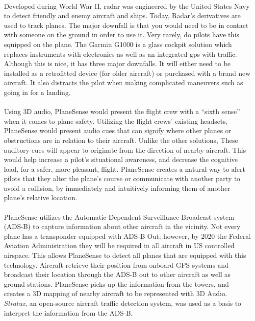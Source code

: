 \paragraph{}
Developed during World War II, radar was engineered by the United States Navy to detect friendly and enemy aircraft and ships. Today, Radar’s derivatives are used to track planes. The major downfall is that you would need to be in contact with someone on the ground in order to use it. Very rarely, do pilots have this equipped on the plane. The Garmin G1000 is a  glass cockpit solution which replaces instruments with electronics as well as an integrated gps with traffic. Although this is nice, it has three major downfalls. It will either need to be installed as a retrofitted device (for older aircraft) or purchased with a brand new aircraft. It also distracts the pilot when making complicated maneuvers such as going in for a landing.  

\paragraph{}

Using 3D audio, PlaneSense would present the flight crew with a “sixth sense” when it comes to plane safety.  Utilizing the flight crews’ existing headsets, PlaneSense would present audio cues that can signify where other planes or obstructions are in relation to their aircraft. Unlike the other solutions, These auditory cues will appear to originate from the direction of nearby aircraft.  This would help increase a pilot’s situational awareness, and decrease the cognitive load, for a safer, more pleasant, flight.  PlaneSense creates a natural way to alert pilots that they alter the plane’s course or communicate with another party to avoid a collision, by immediately and intuitively informing them of another plane's relative location. 


\paragraph{}
PlaneSense utilizes the  Automatic Dependent Surveillance-Broadcast system (ADS-B) to capture information about other aircraft in the vicinity.  Not every plane has a transponder equipped with ADS-B Out; however, by 2020 the Federal Aviation Administration they will be required in all aircraft in US controlled airspace. This allows PlaneSense to detect all planes that are equipped with this technology.  Aircraft retrieve their position from onboard GPS systems and broadcast their location through the ADS-B out to other aircraft as well as ground stations. PlaneSense picks up the information from the towers, and creates a 3D mapping of nearby aircraft to be represented with 3D Audio.  \textit{Stratux}, an open-source aircraft traffic detection system, was used as a basis to interpret the information from the ADS-B.


